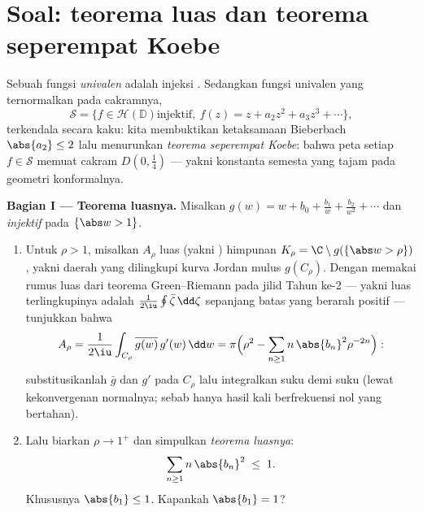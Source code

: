 \section{Soal: teorema luas dan teorema seperempat
Koebe}

\begin{problem}\label{pb:b3:conformal:1}
Sebuah fungsi \emph{univalen} adalah injeksi . Sedangkan
fungsi univalen yang ternormalkan pada cakramnya,
\[
\mathcal S = \bigl\{f \in \mathcal H(\mathbb D) \text{
injektif},\ f(z) = z + a_2z^2 + a_3z^3 + \cdots\bigr\},
\]
terkendala secara kaku: kita membuktikan ketaksamaan Bieberbach
$\abs{a_2} \leq 2$ lalu menurunkan \emph{teorema seperempat
Koebe}: bahwa peta setiap $f \in \mathcal S$ memuat
cakram $D(0, \frac14)$ --- yakni konstanta semesta yang tajam pada
geometri konformalnya.

\medskip
\noindent\textbf{Bagian I --- Teorema luasnya.} Misalkan $g(w) = w
+ b_0 + \frac{b_1}w + \frac{b_2}{w^2} + \cdots$ 
dan \emph{injektif} pada $\{\abs w > 1\}$.
\begin{enumerate}
  \item Untuk $\rho > 1$, misalkan $A_\rho$ luas (yakni ) himpunan  $K_\rho = \C\setminus
        g(\{\abs w > \rho\})$, yakni daerah yang dilingkupi
        kurva Jordan mulus $g(C_\rho)$. Dengan memakai rumus
        luas dari teorema Green--Riemann pada jilid Tahun ke-2
        --- yakni luas terlingkupinya adalah $\frac1{2\iu}
        \oint\bar\zeta\,\dd\zeta$ sepanjang batas yang
        berarah positif --- tunjukkan bahwa
        \[
        A_\rho = \frac{1}{2\iu}\int_{C_\rho}
        \overline{g(w)}\,g'(w)\,\dd w
        = \pi\Bigl(\rho^2 -
        \sum_{n\geq1}n\,\abs{b_n}^2\rho^{-2n}\Bigr) :
        \]
        substitusikanlah  $\bar g$ dan $g'$ pada
        $C_\rho$ lalu integralkan suku demi suku (lewat kekonvergenan
        normalnya; sebab hanya hasil kali berfrekuensi nol yang
        bertahan).
  \item Lalu biarkan $\rho \to 1^+$ dan simpulkan \emph{teorema
        luasnya}:
        \[
        \sum_{n\geq1}n\,\abs{b_n}^2 \;\leq\; 1 .
        \]
        Khususnya $\abs{b_1} \leq 1$. Kapankah $\abs{b_1}
        = 1$?
\end{enumerate}


\end{problem}

